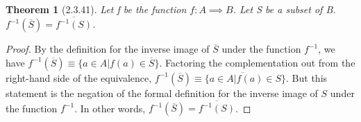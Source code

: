 \documentclass[a4paper, 12pt]{article}
\theoremstyle{plain}
\newtheorem*{theorem*}{Theorem}
\begin{document}
	
	\begin{theorem*}[2.3.41]
		Let f be the function $f: A \implies B$. Let S be a subset of B. $f^{-1}(\overline{S}) = \overline{f^{-1}(S)}$.
	\end{theorem*}
	
	\begin{proof}
		By the definition for the inverse image of $\overline{S}$ under the function $f^{-1}$, we have  $f^{-1}(\overline{S}) \equiv \{a \in A|f(a) \in \overline{S}\}$. Factoring the complementation out from the right-hand side of the equivalence, $f^{-1}(\overline{S}) \equiv \overline{\{a \in A | f(a) \in S}\}$. But this statement is the negation of the formal definition for the inverse image of $S$ under the function $f^{-1}$. In other words, $f^{-1}(\overline{S}) = \overline{f^{-1}(S)}$.
	\end{proof}
\end{document}
